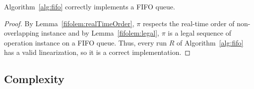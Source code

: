 \documentclass[a4paper,anonymous,USenglish]{lipics-v2021} %
\theoremstyle{definition}
\begin{document}


\begin{theorem}
  Algorithm~\ref{alg:fifo} correctly implements a FIFO queue.
\end{theorem}

\begin{proof}
  By Lemma~\ref{fifolem:realTimeOrder}, $\pi$ respects the real-time order of non-overlapping instance and by Lemma~\ref{fifolem:legal}, $\pi$ is a legal sequence of operation instance on a FIFO queue.  Thus, every run $R$ of Algorithm~\ref{alg:fifo} has a valid linearization, so it is a correct implementation.
\end{proof}
 

\subsection{Complexity}
\end{document}
